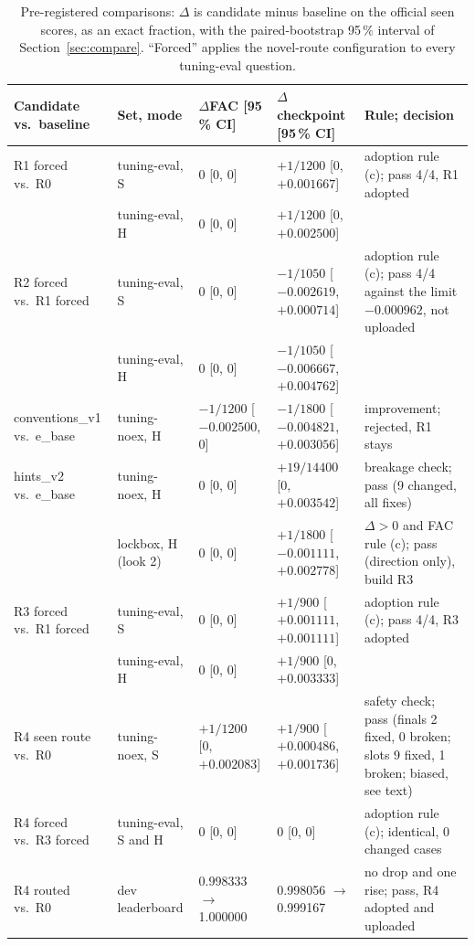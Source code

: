 \documentclass[conference]{IEEEtran}
\begin{document}
\begin{table}[t]
\caption{Pre-registered comparisons: $\Delta$ is candidate minus baseline on the official seen scores, as an exact fraction, with the paired-bootstrap 95\,\% interval of Section~\ref{sec:compare}. ``Forced'' applies the novel-route configuration to every tuning-eval question.}
\label{tab:decisions}
\centering
\scriptsize
\setlength{\tabcolsep}{3pt}
\begin{tabular}{@{}llllp{5.4cm}@{}}
\toprule
Candidate vs.\ baseline & Set, mode & $\Delta$FAC [95\,\% CI] & $\Delta$checkpoint [95\,\% CI] & Rule; decision \\
\midrule
R1 forced vs.\ R0 & tuning-eval, S & 0 [0, 0] & $+1/1200$ [0, $+0.001667$] & adoption rule (c); pass 4/4, R1 adopted \\
 & tuning-eval, H & 0 [0, 0] & $+1/1200$ [0, $+0.002500$] & \\
R2 forced vs.\ R1 forced & tuning-eval, S & 0 [0, 0] & $-1/1050$ [$-0.002619$, $+0.000714$] & adoption rule (c); pass 4/4 against the limit $-0.000962$, not uploaded \\
 & tuning-eval, H & 0 [0, 0] & $-1/1050$ [$-0.006667$, $+0.004762$] & \\
conventions\_v1 vs.\ e\_base & tuning-noex, H & $-1/1200$ [$-0.002500$, 0] & $-1/1800$ [$-0.004821$, $+0.003056$] & improvement; rejected, R1 stays \\
hints\_v2 vs.\ e\_base & tuning-noex, H & 0 [0, 0] & $+19/14400$ [0, $+0.003542$] & breakage check; pass (9 changed, all fixes) \\
 & lockbox, H (look 2) & 0 [0, 0] & $+1/1800$ [$-0.001111$, $+0.002778$] & $\Delta>0$ and FAC rule (c); pass (direction only), build R3 \\
R3 forced vs.\ R1 forced & tuning-eval, S & 0 [0, 0] & $+1/900$ [$+0.001111$, $+0.001111$] & adoption rule (c); pass 4/4, R3 adopted \\
 & tuning-eval, H & 0 [0, 0] & $+1/900$ [0, $+0.003333$] & \\
R4 seen route vs.\ R0 & tuning-noex, S & $+1/1200$ [0, $+0.002083$] & $+1/900$ [$+0.000486$, $+0.001736$] & safety check; pass (finals 2 fixed, 0 broken; slots 9 fixed, 1 broken; biased, see text) \\
R4 forced vs.\ R3 forced & tuning-eval, S and H & 0 [0, 0] & 0 [0, 0] & adoption rule (c); identical, 0 changed cases \\
R4 routed vs.\ R0 & dev leaderboard & 0.998333 $\to$ 1.000000 & 0.998056 $\to$ 0.999167 & no drop and one rise; pass, R4 adopted and uploaded \\
\bottomrule
\end{tabular}
\end{table}
\end{document}
